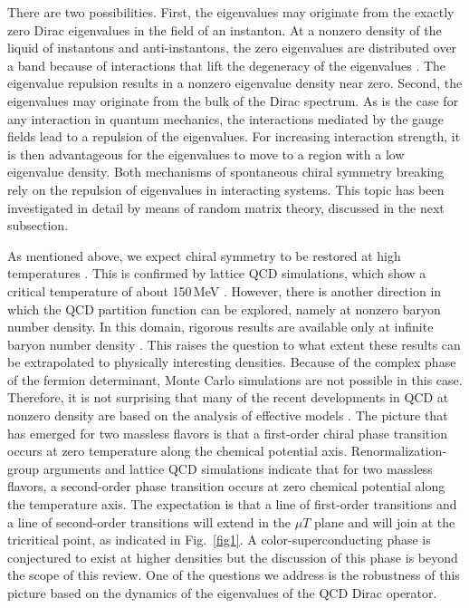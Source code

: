 There are two possibilities. First, the eigenvalues may
originate from the exactly zero Dirac eigenvalues in the field of an
instanton.  At a nonzero density of the liquid of instantons and
anti-instantons, the zero eigenvalues are distributed over a band
because of interactions that lift the degeneracy of the eigenvalues
\cite{shurmit}.  The eigenvalue repulsion results in a nonzero
eigenvalue density near zero.  Second, the eigenvalues may originate
from the bulk of the Dirac spectrum. As is the case for any
interaction in quantum mechanics, the interactions mediated by the
gauge fields lead to a repulsion of the eigenvalues. For increasing
interaction strength, it is then advantageous for the eigenvalues to
move to a region with a low eigenvalue density. Both mechanisms of
spontaneous chiral symmetry breaking rely on the repulsion of
eigenvalues in interacting systems.  This topic has been investigated
in detail by means of random matrix theory, discussed in
the next subsection.

As mentioned above, we expect chiral symmetry to be
restored at high temperatures \cite{smilref}.  This is confirmed by
lattice QCD simulations, which show a critical temperature of about
150\,MeV \cite{karsch}.  However, there is another direction in which
the QCD partition function can be explored, namely at nonzero baryon
number density. In this domain, rigorous results are available only at
infinite baryon number density \cite{son}. This raises the question to
what extent these results can be extrapolated to physically
interesting densities.  Because of the complex phase of the fermion
determinant, Monte Carlo simulations are not possible in this case.
Therefore, it is not surprising that many of the recent developments in
QCD at nonzero density are based on the analysis of effective models
\cite{krishna,edward-thomas}.  The picture that has emerged for two
massless flavors is that a first-order chiral phase transition occurs
at zero temperature along the chemical potential
axis. Renormalization-group arguments and lattice QCD simulations
indicate that for two 
massless flavors, a second-order phase transition occurs at zero
chemical potential along the temperature axis. The expectation is that
a line of first-order transitions and a line of second-order
transitions will extend in the $\mu T$ plane and will join at the
tricritical point, as indicated in Fig.~\ref{fig1}. A
color-superconducting phase is conjectured to exist at higher
densities \cite{krishna,edward-thomas,son} but the discussion of this
phase is beyond the scope of this review.  One of the questions we
address is the robustness of this picture based on the
dynamics of the eigenvalues of the QCD Dirac operator.

